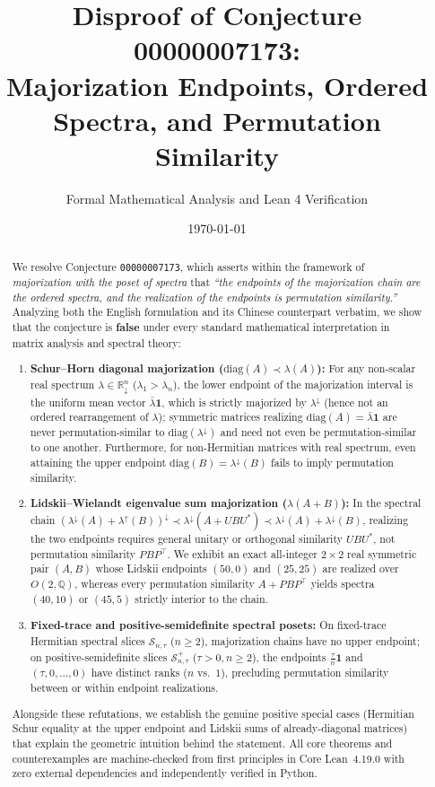 \documentclass[11pt]{article}
\title{\textbf{Disproof of Conjecture 00000007173:\\
Majorization Endpoints, Ordered Spectra, and Permutation Similarity}}
\author{Formal Mathematical Analysis and Lean 4 Verification}
\date{\today}
\theoremstyle{definition}
\theoremstyle{remark}
\newcommand{\R}{\mathbb{R}}
\newcommand{\Q}{\mathbb{Q}}
\newcommand{\diag}{\mathrm{diag}}
\newcommand{\Ones}{\mathbf{1}}
\begin{document}
\maketitle

\begin{abstract}
We resolve Conjecture \texttt{00000007173}, which asserts within the framework of
\emph{majorization with the poset of spectra} that \emph{``the endpoints of the
majorization chain are the ordered spectra, and the realization of the endpoints
is permutation similarity.''} Analyzing both the English formulation and its
Chinese counterpart verbatim, we show that the conjecture is \textbf{false} under
every standard mathematical interpretation in matrix analysis and spectral theory:
\begin{enumerate}
  \item \textbf{Schur--Horn diagonal majorization ($\diag(A) \prec \lambda(A)$):}
  For any non-scalar real spectrum $\lambda \in \R_\downarrow^n$ ($\lambda_1 > \lambda_n$),
  the lower endpoint of the majorization interval is the uniform mean vector
  $\bar{\lambda}\Ones$, which is strictly majorized by $\lambda^\downarrow$ (hence
  not an ordered rearrangement of $\lambda$); symmetric matrices realizing
  $\diag(A) = \bar{\lambda}\Ones$ are never permutation-similar to $\diag(\lambda^\downarrow)$
  and need not even be permutation-similar to one another. Furthermore, for
  non-Hermitian matrices with real spectrum, even attaining the upper endpoint
  $\diag(B) = \lambda^\downarrow(B)$ fails to imply permutation similarity.
  \item \textbf{Lidskii--Wielandt eigenvalue sum majorization ($\lambda(A+B)$):}
  In the spectral chain $(\lambda^\downarrow(A)+\lambda^\uparrow(B))^\downarrow
  \prec \lambda^\downarrow(A + U B U^*) \prec \lambda^\downarrow(A)+\lambda^\downarrow(B)$,
  realizing the two endpoints requires general unitary or orthogonal similarity
  $U B U^*$, not permutation similarity $P B P^\top$. We exhibit an exact
  all-integer $2\times 2$ real symmetric pair $(A,B)$ whose Lidskii endpoints
  $(50,0)$ and $(25,25)$ are realized over $O(2,\Q)$, whereas every permutation
  similarity $A + P B P^\top$ yields spectra $(40,10)$ or $(45,5)$ strictly
  interior to the chain.
  \item \textbf{Fixed-trace and positive-semidefinite spectral posets:}
  On fixed-trace Hermitian spectral slices $\mathcal{S}_{n,\tau}$ ($n \ge 2$),
  majorization chains have no upper endpoint; on positive-semidefinite slices
  $\mathcal{S}_{n,\tau}^+$ ($\tau > 0, n \ge 2$), the endpoints $\frac{\tau}{n}\Ones$
  and $(\tau,0,\dots,0)$ have distinct ranks ($n$ vs.\ $1$), precluding
  permutation similarity between or within endpoint realizations.
\end{enumerate}
Alongside these refutations, we establish the genuine positive special cases
(Hermitian Schur equality at the upper endpoint and Lidskii sums of already-diagonal
matrices) that explain the geometric intuition behind the statement. All core
theorems and counterexamples are machine-checked from first principles in Core
Lean~4.19.0 with zero external dependencies and independently verified in Python.
\end{abstract}
\end{document}
